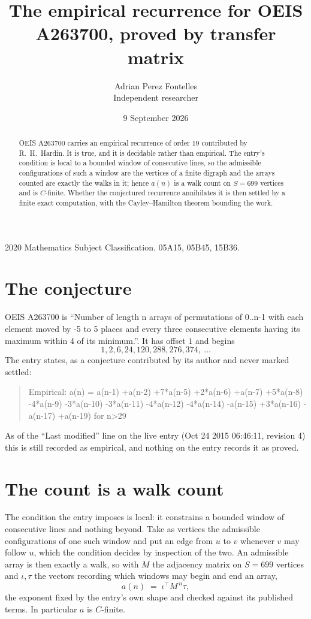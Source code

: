 \documentclass[11pt,a4paper]{article}
\title{The empirical recurrence for OEIS A263700, proved by transfer matrix}
\author{Adrian Perez Fontelles\\ \small Independent researcher}
\date{9 September 2026}
\theoremstyle{plain}
\theoremstyle{definition}
\begin{document}
\maketitle

\begin{abstract}
OEIS A263700 carries an empirical recurrence of order $19$ contributed by R.~H.~Hardin. It is
true, and it is decidable rather than empirical. The entry's condition is local to a bounded window of consecutive lines, so
the admissible configurations of such a window are the vertices of a finite digraph and the
arrays counted are exactly the walks in it; hence $a(n)$ is a walk count on $S=699$ vertices
and is $C$-finite. Whether the conjectured recurrence annihilates it is then settled by a
finite exact computation, with the Cayley--Hamilton theorem bounding the work.
\end{abstract}

\noindent\small 2020 Mathematics Subject Classification. 05A15, 05B45, 15B36.\normalsize

\section{The conjecture}

OEIS A263700 is ``Number of length n arrays of permutations of 0..n-1 with each element moved by -5 to 5 places and every three consecutive elements having its maximum within 4 of its minimum.''. It has offset $1$ and begins
\[
1, 2, 6, 24, 120, 288, 276, 374,\ \dots
\]
The entry states, as a conjecture contributed by its author and never marked settled:
\begin{quote}
Empirical: a(n) = a(n-1) +a(n-2) +7*a(n-5) +2*a(n-6) +a(n-7) +5*a(n-8) -4*a(n-9) -3*a(n-10) -3*a(n-11) -4*a(n-12) -4*a(n-14) -a(n-15) +3*a(n-16) -a(n-17) +a(n-19) for n>29
\end{quote}
As of the ``Last modified'' line on the live entry (Oct 24 2015 06:46:11, revision 4) this is still
recorded as empirical, and nothing on the entry records it as proved.

\section{The count is a walk count}

The condition the entry imposes is local: it constrains a bounded window of consecutive lines and nothing beyond. Take as
vertices the admissible configurations of one such window and put an edge from $u$ to $v$
whenever $v$ may follow $u$, which the condition decides by inspection of the two. An
admissible array is then exactly a walk, so with $M$ the adjacency matrix on $S=699$ vertices
and $\iota,\tau$ the vectors recording which windows may begin and end an array,
\[
a(n)\;=\;\iota^{\!\top}M^{\,n}\tau ,
\]
the exponent fixed by the entry's own shape and checked against its published terms. In
particular $a$ is $C$-finite.
\end{document}
